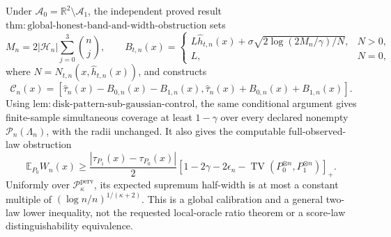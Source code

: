 Under \(\mathcal A_0=\mathbb R^2\setminus\mathcal A_1\), the independent proved result \(\mathrm{thm:global\text{-}honest\text{-}band\text{-}and\text{-}width\text{-}obstruction}\) sets
\[
 M_n=2|\mathcal H_n|\sum_{j=0}^3\binom nj,
 \qquad
 B_{t,n}(x)=
 \begin{cases}
 L\widehat h_{t,n}(x)+\sigma\sqrt{2\log(2M_n/\gamma)/N},&N>0,\\
 L,&N=0,
 \end{cases}
\]
where \(N=N_{t,n}(x,\widehat h_{t,n}(x))\), and constructs
\[
 \mathcal C_n(x)=
 [\widehat\tau_n(x)-B_{0,n}(x)-B_{1,n}(x),
   \widehat\tau_n(x)+B_{0,n}(x)+B_{1,n}(x)].
\]
Using \(\mathrm{lem:disk\text{-}pattern\text{-}sub\text{-}gaussian\text{-}control}\), the same conditional argument gives finite-sample simultaneous coverage at least \(1-\gamma\) over every declared nonempty \(\mathcal P_n(\Lambda_n)\), with the radii unchanged. It also gives the computable full-observed-law obstruction
\[
 \mathbb E_{P_0}W_n(x)\ge
 \frac{|\tau_{P_1}(x)-\tau_{P_0}(x)|}{2}
 \left[1-2\gamma-2\epsilon_n-
 \operatorname{TV}(P_0^{\otimes n},P_1^{\otimes n})\right]_+.
\]
Uniformly over \(\mathcal P_{\kappa}^{\mathrm{perv}}\), its expected supremum half-width is at most a constant multiple of \((\log n/n)^{1/(\kappa+2)}\). This is a global calibration and a general two-law lower inequality, not the requested local-oracle ratio theorem or a score-law distinguishability equivalence.